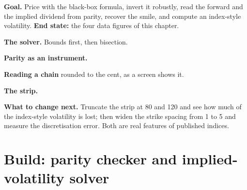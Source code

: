 \begin{tutorial}
\textbf{Goal.} Price with the black-box formula, invert it robustly, read the
forward and the implied dividend from parity, recover the smile, and compute
an index-style volatility. \textbf{End state:} the four data figures of this
chapter.
\begin{tutsteps}
\item \textbf{The solver.} Bounds first, then bisection.
\label{lst:m1:volatility-first-contact:solver}
\item \textbf{Parity as an instrument.}
\label{lst:m1:volatility-first-contact:parity}
\item \textbf{Reading a chain} rounded to the cent, as a screen shows it.
\label{lst:m1:volatility-first-contact:read}
\item \textbf{The strip.}
\label{lst:m1:volatility-first-contact:strip}
\end{tutsteps}
\textbf{What to change next.} Truncate the strip at 80 and 120 and see how
much of the index-style volatility is lost; then widen the strike spacing
from 1 to 5 and measure the discretisation error. Both are real features of
published indices.
\end{tutorial}

\section{Build: parity checker and implied-volatility solver}\label{bld:m1:volatility-first-contact:parity}


